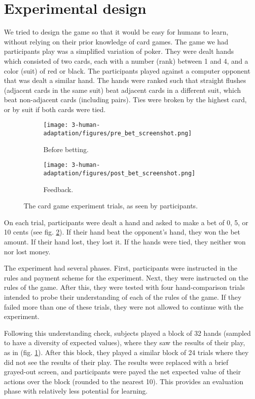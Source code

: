 \section{Experimental design}
We tried to design the game so that it would be easy for humans to learn, without relying on their prior knowledge of card games. The game we had participants play was a simplified variation of poker. They were dealt hands which consisted of two cards, each with a number (rank) between 1 and 4, and a color (suit) of red or black. The participants played against a computer opponent that was dealt a similar hand. The hands were ranked such that straight flushes (adjacent cards in the same suit) beat adjacent cards in a different suit, which beat non-adjacent cards (including pairs). Ties were broken by the highest card, or by suit if both cards were tied. \par
\begin{figure}
\centering
\begin{subfigure}[b]{0.5\textwidth}
\texttt{[image: 3-human-adaptation/figures/pre\_bet\_screenshot.png]}
\caption{Before betting.}
\end{subfigure}%
\begin{subfigure}[b]{0.5\textwidth}
\texttt{[image: 3-human-adaptation/figures/post\_bet\_screenshot.png]}
\caption{Feedback.} \label{fig:human_betting_trial_feedback}
\end{subfigure}%
\caption{The card game experiment trials, as seen by participants.} \label{fig:human_betting_trial}
\end{figure}
On each trial, participants were dealt a hand and asked to make a bet of 0, 5, or 10 cents (see fig. \ref{fig:human_betting_trial}). If their hand beat the opponent's hand, they won the bet amount. If their hand lost, they lost it. If the hands were tied, they neither won nor lost money. \par
The experiment had several phases. First, participants were instructed in the rules and payment scheme for the experiment. Next, they were instructed on the rules of the game. After this, they were tested with four hand-comparison trials intended to probe their understanding of each of the rules of the game. If they failed more than one of these trials, they were not allowed to continue with the experiment. \par
Following this understanding check, subjects played a block of 32 hands (sampled to have a diversity of expected values), where they saw the results of their play, as in (fig. \ref{fig:human_betting_trial_feedback}). After this block, they played a similar block of 24 trials where they did not see the results of their play. The results were replaced with a brief grayed-out screen, and participants were payed the net expected value of their actions over the block (rounded to the nearest 10). This provides an evaluation phase with relatively less potential for learning. \par
